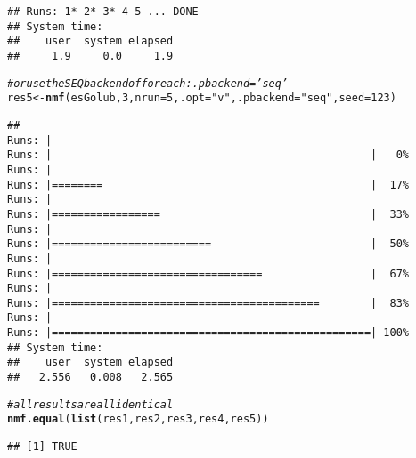 \documentclass[a4paper]{article}\usepackage[]{graphicx}\usepackage[]{color}
\makeatletter
\newcommand{\hlnum}[1]{\textcolor[rgb]{0.686,0.059,0.569}{#1}}%
\newcommand{\hlstr}[1]{\textcolor[rgb]{0.192,0.494,0.8}{#1}}%
\newcommand{\hlcom}[1]{\textcolor[rgb]{0.678,0.584,0.686}{\textit{#1}}}%
\newcommand{\hlstd}[1]{\textcolor[rgb]{0.345,0.345,0.345}{#1}}%
\newcommand{\hlkwb}[1]{\textcolor[rgb]{0.69,0.353,0.396}{#1}}%
\newcommand{\hlkwc}[1]{\textcolor[rgb]{0.333,0.667,0.333}{#1}}%
\newcommand{\hlkwd}[1]{\textcolor[rgb]{0.737,0.353,0.396}{\textbf{#1}}}%
\newenvironment{kframe}{%
 \def\at@end@of@kframe{}%
 \ifinner\ifhmode%
  \def\at@end@of@kframe{\end{minipage}}%
  \begin{minipage}{\columnwidth}%
 \fi\fi%
 \def\FrameCommand##1{\hskip\@totalleftmargin \hskip-\fboxsep
 \colorbox{shadecolor}{##1}\hskip-\fboxsep
     \hskip-\linewidth \hskip-\@totalleftmargin \hskip\columnwidth}%
 \MakeFramed {\advance\hsize-\width
   \@totalleftmargin\z@ \linewidth\hsize
   \@setminipage}}%
 {\par\unskip\endMakeFramed%
 \at@end@of@kframe}
\newenvironment{knitrout}{}{} %
\makeatother
\begin{document}
\begin{knitrout}
\begin{kframe}
{\ttfamily\noindent\itshape\color{messagecolor}{\#\# NMF algorithm: 'brunet'\\\#\# Multiple runs: 5\\\#\# Mode: sequential [sapply]}}\begin{verbatim}
## Runs: 1* 2* 3* 4 5 ... DONE
## System time:
##    user  system elapsed 
##     1.9     0.0     1.9
\end{verbatim}
\begin{alltt}
\hlcom{# or use the SEQ backend of foreach: .pbackend='seq'}
\hlstd{res5} \hlkwb{<-} \hlkwd{nmf}\hlstd{(esGolub,} \hlnum{3}\hlstd{,} \hlkwc{nrun} \hlstd{=} \hlnum{5}\hlstd{,} \hlkwc{.opt} \hlstd{=} \hlstr{"v"}\hlstd{,} \hlkwc{.pbackend} \hlstd{=} \hlstr{"seq"}\hlstd{,} \hlkwc{seed} \hlstd{=} \hlnum{123}\hlstd{)}
\end{alltt}


{\ttfamily\noindent\itshape\color{messagecolor}{\#\# NMF algorithm: 'brunet'\\\#\# Multiple runs: 5\\\#\# Mode: sequential [foreach:doSEQ]}}\begin{verbatim}
## 
Runs: |                                                        
Runs: |                                                  |   0%
Runs: |                                                        
Runs: |========                                          |  17%
Runs: |                                                        
Runs: |=================                                 |  33%
Runs: |                                                        
Runs: |=========================                         |  50%
Runs: |                                                        
Runs: |=================================                 |  67%
Runs: |                                                        
Runs: |==========================================        |  83%
Runs: |                                                        
Runs: |==================================================| 100%
## System time:
##    user  system elapsed 
##   2.556   0.008   2.565
\end{verbatim}
\begin{alltt}
\hlcom{# all results are all identical}
\hlkwd{nmf.equal}\hlstd{(}\hlkwd{list}\hlstd{(res1, res2, res3, res4, res5))}
\end{alltt}
\begin{verbatim}
## [1] TRUE
\end{verbatim}
\end{kframe}
\end{knitrout}
\end{document}
